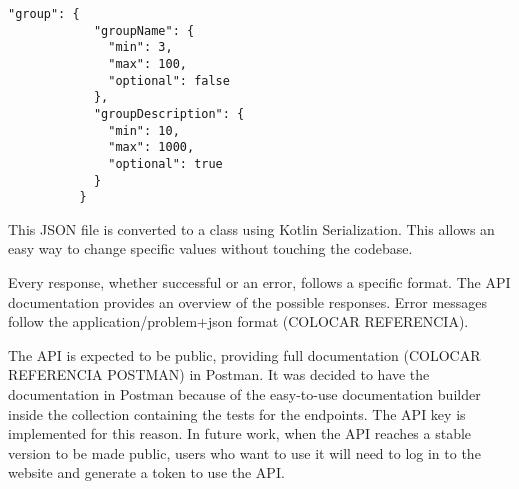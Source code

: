 \begin{center}
    \begin{lstlisting}[caption={Example of the group entry}]
        "group": {
            "groupName": {
              "min": 3,
              "max": 100,
              "optional": false
            },
            "groupDescription": {
              "min": 10,
              "max": 1000,
              "optional": true
            }
          }
    \end{lstlisting}
\end{center}

This JSON file is converted to a class using Kotlin Serialization. This allows an easy way to change specific values without touching the codebase.

\vspace{3mm}

Every response, whether successful or an error, follows a specific format. The API documentation provides an overview of the possible responses. Error messages follow the application/problem+json format (COLOCAR REFERENCIA).

\vspace{3mm}

The API is expected to be public, providing full documentation (COLOCAR REFERENCIA POSTMAN) in Postman. It was decided to have the documentation in Postman because of the easy-to-use documentation builder inside the collection containing the tests for the endpoints. The API key is implemented for this reason. In future work, when the API reaches a stable version to be made public, users who want to use it will need to log in to the website and generate a token to use the API.